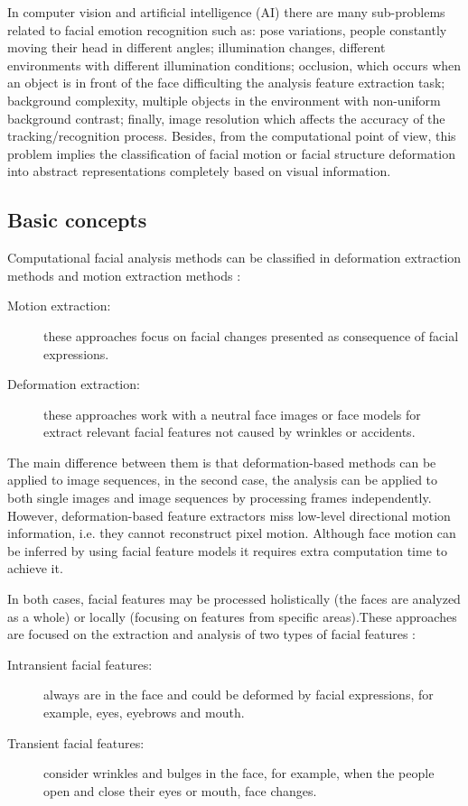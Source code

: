 In computer vision and artificial intelligence (AI) there are many sub-problems related to facial emotion recognition such as: pose variations, people constantly moving their head in different angles; illumination changes, different environments with different illumination conditions; occlusion, which occurs when an object is in front of the face difficulting the analysis feature extraction task; background complexity, multiple objects in the environment with non-uniform background contrast; finally, image resolution which affects the accuracy of the tracking/recognition process. Besides, from the computational point of view, this problem implies the classification of facial motion or facial structure deformation into abstract representations completely based on visual information.

\subsection{Basic concepts}

Computational facial analysis methods can be classified in deformation extraction methods and motion extraction methods \cite{Fasel1999}:
\begin{description}
\item[Motion extraction:] these approaches focus on facial changes presented as consequence of facial expressions.
\item[Deformation extraction:] these approaches work with a neutral face images or face models for extract relevant facial features not caused by wrinkles or accidents.
\end{description}

The main difference between them is that deformation-based methods can be applied to image sequences, in the second case, the analysis can be applied to both single images and image sequences by processing frames independently. However, deformation-based feature extractors miss low-level directional motion information, i.e. they cannot reconstruct pixel motion. Although face motion can be inferred by using facial feature models it requires extra computation time to achieve it.

In both cases, facial features may be processed holistically (the faces are analyzed as a whole) or locally (focusing on features from specific areas).These approaches are focused on the extraction and analysis of two types of facial features \cite{Fasel1999}:
\begin{description}
\item[Intransient facial features:] always are in the face and could be deformed by facial expressions, for example, eyes, eyebrows and mouth.
\item[Transient facial features:] consider wrinkles and bulges in the face, for example, when the people open and close their eyes or mouth, face changes.
\end{description}

